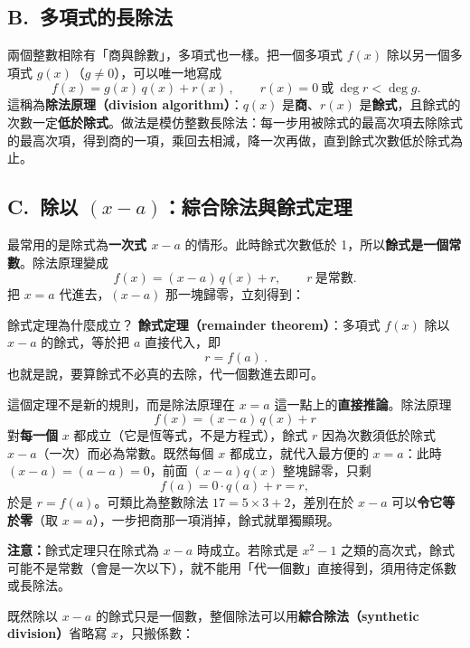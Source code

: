 \documentclass[11pt]{article}
\begin{document}
\subsection*{\sffamily B.\ 多項式的長除法}

兩個整數相除有「商與餘數」，多項式也一樣。把一個多項式 $f(x)$ 除以另一個多項式 $g(x)$（$g\neq 0$），可以唯一地寫成
$$\boxed{\,f(x)=g(x)\,q(x)+r(x)\,},\qquad r(x)=0\ \text{或}\ \deg r<\deg g.$$
這稱為\textbf{除法原理（division algorithm）}：$q(x)$ 是\textbf{商}、$r(x)$ 是\textbf{餘式}，且餘式的次數一定\textbf{低於除式}。做法是模仿整數長除法：每一步用被除式的最高次項去除除式的最高次項，得到商的一項，乘回去相減，降一次再做，直到餘式次數低於除式為止。

\subsection*{\sffamily C.\ 除以 $(x-a)$：綜合除法與餘式定理}

最常用的是除式為\textbf{一次式 $x-a$} 的情形。此時餘式次數低於 1，所以\textbf{餘式是一個常數}。除法原理變成
$$f(x)=(x-a)\,q(x)+r,\qquad r\ \text{是常數}.$$
把 $x=a$ 代進去，$(x-a)$ 那一塊歸零，立刻得到：

\begin{補充框}{餘式定理為什麼成立？}
\textbf{餘式定理（remainder theorem）}：多項式 $f(x)$ 除以 $x-a$ 的餘式，等於把 $a$ 直接代入，即
$$\boxed{\,r=f(a)\,}.$$
也就是說，要算餘式不必真的去除，代一個數進去即可。

這個定理不是新的規則，而是除法原理在 $x=a$ 這一點上的\textbf{直接推論}。除法原理
$$f(x)=(x-a)\,q(x)+r$$
對\textbf{每一個} $x$ 都成立（它是恆等式，不是方程式），餘式 $r$ 因為次數須低於除式 $x-a$（一次）而必為常數。既然每個 $x$ 都成立，就代入最方便的 $x=a$：此時 $(x-a)=(a-a)=0$，前面 $(x-a)q(x)$ 整塊歸零，只剩
$$f(a)=0\cdot q(a)+r=r,$$
於是 $r=f(a)$。可類比為整數除法 $17=5\times3+2$，差別在於 $x-a$ 可以\textbf{令它等於零}（取 $x=a$），一步把商那一項消掉，餘式就單獨顯現。

\textbf{注意：}餘式定理只在除式為 $x-a$ 時成立。若除式是 $x^2-1$ 之類的高次式，餘式可能不是常數（會是一次以下），就不能用「代一個數」直接得到，須用待定係數或長除法。
\end{補充框}

既然除以 $x-a$ 的餘式只是一個數，整個除法可以用\textbf{綜合除法（synthetic division）}省略寫 $x$，只搬係數：
\end{document}
